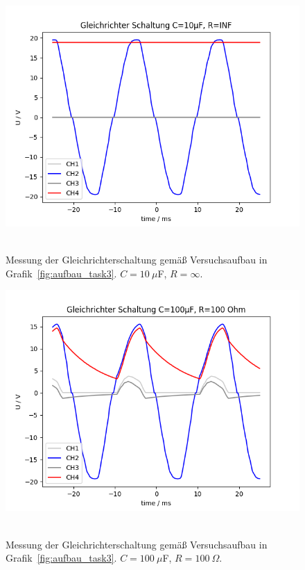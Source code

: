 \documentclass{article}
\begin{document}
\begin{figure}[H]
\caption{Messung der Gleichrichterschaltung gemäß Versuchsaufbau in Grafik~\ref{fig:aufbau_task3}. $C=10~\mu$F, $R=\infty$.}
\label{fig:grafik_task3_10_inf}
{\centering
\includegraphics[scale=0.6]{bilder/task3_10mu_Rinf.png}
~
}
\end{figure}





\begin{figure}[H]
\caption{Messung der Gleichrichterschaltung gemäß Versuchsaufbau in Grafik~\ref{fig:aufbau_task3}. $C=100~\mu$F, $R=100~\Omega$.}
\label{fig:grafik_task3_100_100}
{\centering
\includegraphics[scale=0.6]{bilder/task3_100mu_R100.png}
~
}
\end{figure}
\end{document}
